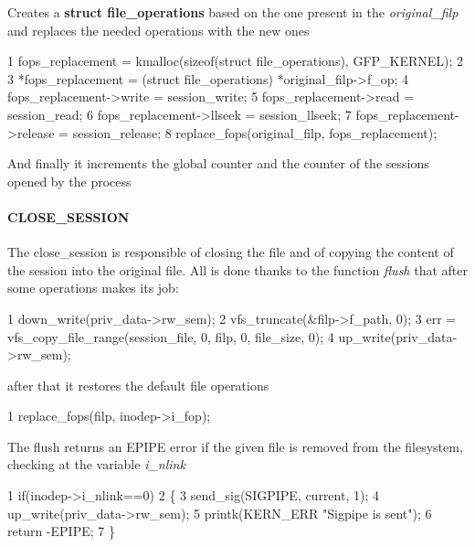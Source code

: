 \begin{DoxyItemize}
\item Creates a {\bfseries struct file\+\_\+operations} based on the one present in the {\itshape original\+\_\+filp} and replaces the needed operations with the new ones
\end{DoxyItemize}


\begin{DoxyCode}
1 fops\_replacement = kmalloc(sizeof(struct file\_operations), GFP\_KERNEL);
2 
3             *fops\_replacement = (struct file\_operations) *original\_filp->f\_op;
4             fops\_replacement->write = session\_write;
5             fops\_replacement->read = session\_read;
6             fops\_replacement->llseek = session\_llseek;
7             fops\_replacement->release = session\_release;  
8             replace\_fops(original\_filp, fops\_replacement);
\end{DoxyCode}


And finally it increments the global counter and the counter of the sessions opened by the process

\paragraph*{C\+L\+O\+S\+E\+\_\+\+S\+E\+S\+S\+I\+ON}

The close\+\_\+session is responsible of closing the file and of copying the content of the session into the original file. All is done thanks to the function {\itshape flush} that after some operations makes its job\+: 
\begin{DoxyCode}
1 down\_write(priv\_data->rw\_sem);
2 vfs\_truncate(&filp->f\_path, 0);
3 err = vfs\_copy\_file\_range(session\_file, 0, filp, 0, file\_size, 0); 
4 up\_write(priv\_data->rw\_sem);
\end{DoxyCode}


after that it restores the default file operations 
\begin{DoxyCode}
1 replace\_fops(filp, inodep->i\_fop);
\end{DoxyCode}


The flush returns an E\+P\+I\+PE error if the given file is removed from the filesystem, checking at the variable {\itshape i\+\_\+nlink} 
\begin{DoxyCode}
1 if(inodep->i\_nlink==0)
2 \{
3     send\_sig(SIGPIPE, current, 1);
4     up\_write(priv\_data->rw\_sem);
5     printk(KERN\_ERR "Sigpipe is sent");
6     return -EPIPE;
7 \}
\end{DoxyCode}


